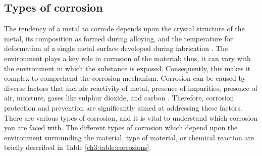 \subsection{Types of corrosion} 
The tendency of a metal to corrode depends upon the crystal structure of the metal, its composition as formed during alloying, and the temperature for deformation of a single metal surface developed during fabrication \cite{sourmail2005stainless}. The environment plays a key role in corrosion of the material; thus, it can vary with the environment in which the substance is exposed. Consequently, this makes it complex to comprehend the corrosion mechanism. Corrosion can be caused by diverse factors that include reactivity of metal, presence of impurities, presence of air, moisture, gases like sulphur dioxide, and carbon \cite{sourmail2005stainless}. Therefore, corrosion protection and prevention are significantly aimed at addressing these factors. There are various types of corrosion, and it is vital to understand which corrosion you are faced with. The different types of corrosion which depend upon the environment surrounding the material, type of material, or chemical reaction are briefly described in Table \ref{ch3:table:corrosions}.

